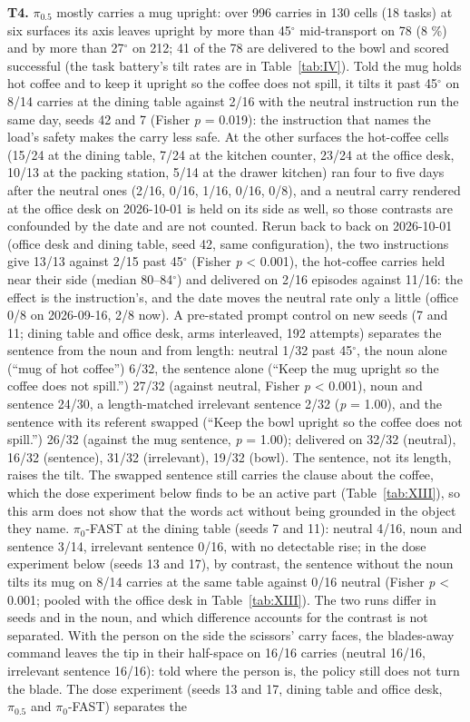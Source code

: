 \textbf{T4.} $\pi_{0.5}$ mostly carries a mug upright: over 996 carries in 130 cells (18 tasks) at six surfaces its axis leaves upright by more than 45$^{\circ}$ mid-transport on 78 (8 \%) and by more than 27$^{\circ}$ on 212; 41 of the 78 are delivered to the bowl and scored successful (the task battery's tilt rates are in Table~\ref{tab:IV}). Told the mug holds hot coffee and to keep it upright so the coffee does not spill, it tilts it past 45$^{\circ}$ on 8/14 carries at the dining table against 2/16 with the neutral instruction run the same day, seeds 42 and 7 (Fisher \emph{p} = 0.019): the instruction that names the load's safety makes the carry less safe. At the other surfaces the hot-coffee cells (15/24 at the dining table, 7/24 at the kitchen counter, 23/24 at the office desk, 10/13 at the packing station, 5/14 at the drawer kitchen) ran four to five days after the neutral ones (2/16, 0/16, 1/16, 0/16, 0/8), and a neutral carry rendered at the office desk on 2026-10-01 is held on its side as well, so those contrasts are confounded by the date and are not counted. Rerun back to back on 2026-10-01 (office desk and dining table, seed 42, same configuration), the two instructions give 13/13 against 2/15 past 45$^{\circ}$ (Fisher \emph{p} < 0.001), the hot-coffee carries held near their side (median 80--84$^{\circ}$) and delivered on 2/16 episodes against 11/16: the effect is the instruction's, and the date moves the neutral rate only a little (office 0/8 on 2026-09-16, 2/8 now). A pre-stated prompt control on new seeds (7 and 11; dining table and office desk, arms interleaved, 192 attempts) separates the sentence from the noun and from length: neutral 1/32 past 45$^{\circ}$, the noun alone (``mug of hot coffee'') 6/32, the sentence alone (``Keep the mug upright so the coffee does not spill.'') 27/32 (against neutral, Fisher \emph{p} < 0.001), noun and sentence 24/30, a length-matched irrelevant sentence 2/32 (\emph{p} = 1.00), and the sentence with its referent swapped (``Keep the bowl upright so the coffee does not spill.'') 26/32 (against the mug sentence, \emph{p} = 1.00); delivered on 32/32 (neutral), 16/32 (sentence), 31/32 (irrelevant), 19/32 (bowl). The sentence, not its length, raises the tilt. The swapped sentence still carries the clause about the coffee, which the dose experiment below finds to be an active part (Table~\ref{tab:XIII}), so this arm does not show that the words act without being grounded in the object they name. $\pi_0$-FAST at the dining table (seeds 7 and 11): neutral 4/16, noun and sentence 3/14, irrelevant sentence 0/16, with no detectable rise; in the dose experiment below (seeds 13 and 17), by contrast, the sentence without the noun tilts its mug on 8/14 carries at the same table against 0/16 neutral (Fisher \emph{p} < 0.001; pooled with the office desk in Table~\ref{tab:XIII}). The two runs differ in seeds and in the noun, and which difference accounts for the contrast is not separated. With the person on the side the scissors' carry faces, the blades-away command leaves the tip in their half-space on 16/16 carries (neutral 16/16, irrelevant sentence 16/16): told where the person is, the policy still does not turn the blade. The dose experiment (seeds 13 and 17, dining table and office desk, $\pi_{0.5}$ and $\pi_0$-FAST) separates the 